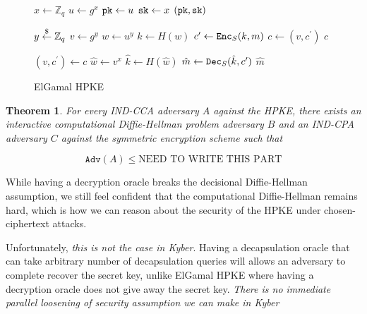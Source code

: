 \documentclass{article}
\newtheorem{theorem}{Theorem}[section]
\begin{document}
\begin{figure}[H]
    \begin{algorithm}[H]
        \caption{$\keygen$}
        \begin{algorithmic}[1]
            \State $x \leftarrow \mathbb{Z}_q$
            \State $u \leftarrow g^x$
            \State $\texttt{pk} \leftarrow u$
            \State $\texttt{sk} \leftarrow x$
            \State \Return $(\texttt{pk}, \texttt{sk})$
        \end{algorithmic}
    \end{algorithm}
    \begin{algorithm}[H]
        \caption{$\encrypt(\pk = u, m \in \mathcal{M})$}
        \begin{algorithmic}[1]
            \State $y \stackrel{\$}{\leftarrow} \mathbb{Z}_q$
            \State $v \leftarrow g^y$
            \State $w \leftarrow u^y$
            \State $k \leftarrow H(w)$
            \State $c^\prime \leftarrow \texttt{Enc}_S(k, m)$
            \State $c \leftarrow (v, c^\prime)$
            \State \Return $c$
        \end{algorithmic}
    \end{algorithm}
    \begin{algorithm}[H]
        \caption{$\decrypt(\sk = x, c)$}
        \begin{algorithmic}[1]
            \State $(v, c^\prime) \leftarrow c$
            \State $\hat{w} \leftarrow v^x$
            \State $\hat{k} \leftarrow H(\hat{w})$
            \State $\hat{m} \leftarrow \texttt{Dec}_S(\hat{k}, c^\prime)$
            \State \Return $\hat{m}$
        \end{algorithmic}
    \end{algorithm}
    \caption{ElGamal HPKE}\label{fig:cca-elgamal-routines}
\end{figure}

\begin{theorem}
    For every IND-CCA adversary $A$ against the HPKE, there exists an \emph{interactive computational Diffie-Hellman problem} adversary $B$ and an IND-CPA adversary $C$ against the symmetric encryption scheme such that

    \begin{equation*}
        \texttt{Adv}(A) \leq \text{NEED TO WRITE THIS PART}
    \end{equation*}
\end{theorem}

While having a decryption oracle breaks the decisional Diffie-Hellman assumption, we still feel confident that the computational Diffie-Hellman remains hard, which is how we can reason about the security of the HPKE under chosen-ciphertext attacks.

Unfortunately, \emph{this is not the case in Kyber}. Having a decapsulation oracle that can take arbitrary number of decapsulation queries will allows an adversary to complete recover the secret key, unlike ElGamal HPKE where having a decryption oracle does not give away the secret key. \emph{There is no immediate parallel loosening of security assumption we can make in Kyber}



\end{document}
